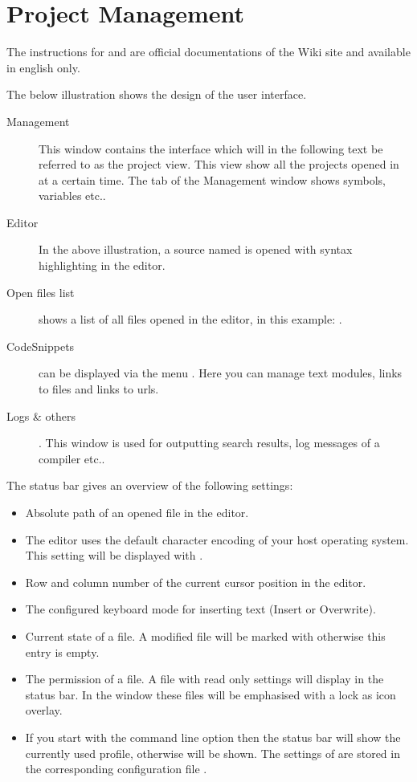 \chapter{\codeblocks Project Management}

The instructions for  and  are official documentations of the \codeblocks Wiki site and available in english only.

The below illustration shows the design of the \codeblocks user interface.


\begin{description}
\item[Management] This window contains the interface  which will in the following text be referred to as the project view. This view show all the projects opened in \codeblocks at a certain time. The  tab of the Management window shows symbols, variables etc..
\item[Editor] In the above illustration, a source named  is opened with syntax highlighting in the editor.
\item[Open files list] shows a list of all files opened in the editor, in this example: .
\item[CodeSnippets] can be displayed via the menu . Here you can manage text modules, links to files and links to urls.
\item[Logs \& others]. This window is used for outputting search results, log messages of a compiler etc..
\end{description}

The status bar gives an overview of the following settings:

\begin{itemize}
\item Absolute path of an opened file in the editor.
\item The editor uses the default character encoding of your host operating system. This setting will be displayed with .
\item Row and column number of the current cursor position in the editor.
\item The configured keyboard mode for inserting text (Insert or Overwrite).
\item Current state of a file. A modified file will be marked with  otherwise this entry is empty.
\item The permission of a file. A file with read only settings will display  in the status bar. In the window  these files will be emphasised with a lock as icon overlay.
\item If you start \codeblocks with the command line option  then the status bar will show the currently used profile, otherwise  will be shown. The settings of \codeblocks are stored in the corresponding configuration file .
\end{itemize}

